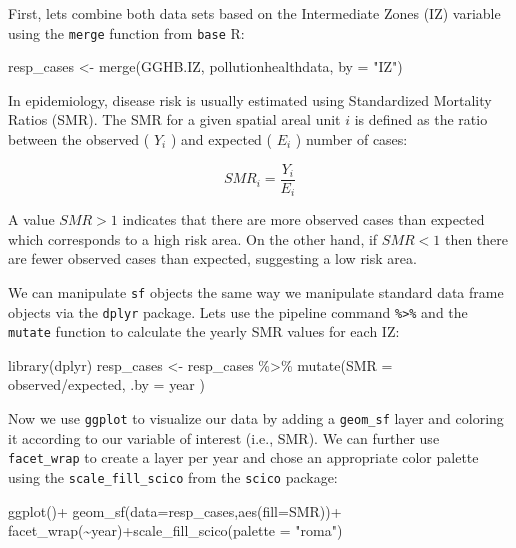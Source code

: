 \documentclass[
  letterpaper,
  DIV=11,
  numbers=noendperiod]{scrartcl}
\newenvironment{Shaded}{\begin{snugshade}}{\end{snugshade}}
\newcommand{\AttributeTok}[1]{\textcolor[rgb]{0.40,0.45,0.13}{#1}}
\newcommand{\FunctionTok}[1]{\textcolor[rgb]{0.28,0.35,0.67}{#1}}
\newcommand{\NormalTok}[1]{\textcolor[rgb]{0.00,0.23,0.31}{#1}}
\newcommand{\OtherTok}[1]{\textcolor[rgb]{0.00,0.23,0.31}{#1}}
\newcommand{\SpecialCharTok}[1]{\textcolor[rgb]{0.37,0.37,0.37}{#1}}
\newcommand{\StringTok}[1]{\textcolor[rgb]{0.13,0.47,0.30}{#1}}
\begin{document}
First, lets combine both data sets based on the Intermediate Zones (IZ)
variable using the \texttt{merge} function from \texttt{base} R:

\begin{Shaded}
\begin{Highlighting}[]
\NormalTok{resp\_cases }\OtherTok{\textless{}{-}} \FunctionTok{merge}\NormalTok{(GGHB.IZ, pollutionhealthdata, }\AttributeTok{by =} \StringTok{"IZ"}\NormalTok{)}
\end{Highlighting}
\end{Shaded}

In epidemiology, disease risk is usually estimated using Standardized
Mortality Ratios (SMR). The SMR for a given spatial areal unit \(i\) is
defined as the ratio between the observed ( \(Y_i\) ) and expected (
\(E_i\) ) number of cases:

\[
SMR_i = \dfrac{Y_i}{E_i}
\]

A value \(SMR > 1\) indicates that there are more observed cases than
expected which corresponds to a high risk area. On the other hand, if
\(SMR<1\) then there are fewer observed cases than expected, suggesting
a low risk area.

We can manipulate \texttt{sf} objects the same way we manipulate
standard data frame objects via the \texttt{dplyr} package. Lets use the
pipeline command \texttt{\%\textgreater{}\%} and the \texttt{mutate}
function to calculate the yearly SMR values for each IZ:

\begin{Shaded}
\begin{Highlighting}[]
\FunctionTok{library}\NormalTok{(dplyr)}
\NormalTok{resp\_cases }\OtherTok{\textless{}{-}}\NormalTok{ resp\_cases }\SpecialCharTok{\%\textgreater{}\%} 
  \FunctionTok{mutate}\NormalTok{(}\AttributeTok{SMR =}\NormalTok{ observed}\SpecialCharTok{/}\NormalTok{expected, }\AttributeTok{.by =}\NormalTok{ year )}
\end{Highlighting}
\end{Shaded}

Now we use \texttt{ggplot} to visualize our data by adding a
\texttt{geom\_sf} layer and coloring it according to our variable of
interest (i.e., SMR). We can further use \texttt{facet\_wrap} to create
a layer per year and chose an appropriate color palette using the
\texttt{scale\_fill\_scico} from the \texttt{scico} package:

\begin{Shaded}
\begin{Highlighting}[]
\FunctionTok{ggplot}\NormalTok{()}\SpecialCharTok{+}
  \FunctionTok{geom\_sf}\NormalTok{(}\AttributeTok{data=}\NormalTok{resp\_cases,}\FunctionTok{aes}\NormalTok{(}\AttributeTok{fill=}\NormalTok{SMR))}\SpecialCharTok{+}
  \FunctionTok{facet\_wrap}\NormalTok{(}\SpecialCharTok{\textasciitilde{}}\NormalTok{year)}\SpecialCharTok{+}\FunctionTok{scale\_fill\_scico}\NormalTok{(}\AttributeTok{palette =} \StringTok{"roma"}\NormalTok{)}
\end{Highlighting}
\end{Shaded}
\end{document}
